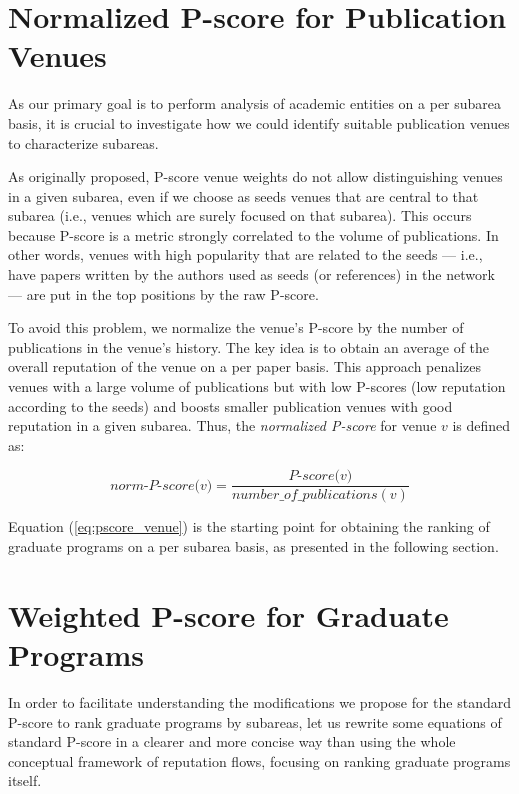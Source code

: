 \documentclass[msc]{ppgccufmg}
\begin{document}
\section{Normalized P-score for Publication Venues}\label{sec:npscore}

As our primary goal is to perform analysis of academic entities on a per subarea basis, it is crucial to investigate how we could identify suitable publication venues to characterize subareas. 

As originally proposed, P-score venue weights do not allow distinguishing venues in a given subarea, even if we choose as seeds venues that are central to that subarea (i.e., venues which are surely focused on that subarea). This occurs because P-score is a metric strongly correlated to the volume of publications. In other words, venues with high popularity that are related to the seeds --- i.e., have papers written by the authors used as seeds (or references) in the network --- are put in the top positions by the raw P-score.

To avoid this problem, we normalize the venue's P-score by the number of publications in the venue's history. The key idea is to obtain an average of the overall reputation of the venue on a per paper basis. This approach penalizes venues with a large volume of publications but with low P-scores (low reputation according to the seeds) and boosts smaller publication venues with good reputation in a given subarea. Thus, the \textit{normalized P-score} for venue $v$ is defined as: 

\begin{equation}\label{eq:pscore_venue}
    \textit{norm-P-score($v$)} = \frac{\textit{P-score($v$)}}{\textit{number\_of\_publications}(v)}
\end{equation}

Equation (\ref{eq:pscore_venue}) is the starting point for obtaining the ranking of graduate programs on a per subarea basis, as presented in the following section. 

\section{Weighted P-score for Graduate Programs}\label{sec:wpscore}

In order to facilitate understanding the modifications we propose for the standard P-score to rank graduate programs by subareas, let us rewrite some equations of standard P-score in a clearer and more concise way than using the whole conceptual framework of reputation flows, focusing on ranking graduate programs itself.
\end{document}
